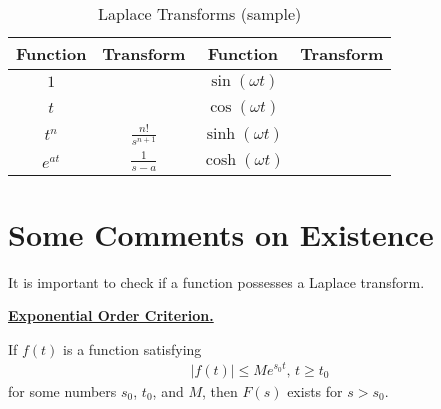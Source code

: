 \documentclass[12pt,a4paper]{article}
\newcommand{\hideNotes}[1]{%
	\phantom{#1}
	}
\newcommand{\hideNotes}[1]{#1}
\begin{document}
\begin{table}[ht!]
\centering
{\renewcommand{\arraystretch}{2.49}
	\setlength{\tabcolsep}{2pt}
\begin{tabular}{|c|c||c|c|}
\hline
\hspace{0.75cm} \textbf{Function} \hspace{0.75cm} & \hspace{0.75cm} \textbf{Transform} \hspace{0.75cm} & \hspace{0.75cm} \textbf{Function} \hspace{0.75cm}  & \hspace{0.75cm} \textbf{Transform} \hspace{0.75cm} \\\hline
\hfill $1$ \hfill\hfill & $\hideNotes{\displaystyle\frac{1}{s}}$ &  \hfill $\sin (\omega t )$ \hfill \hfill & $\hideNotes{\displaystyle\frac{\omega}{s^2 + \omega^2}}$ \\\hline
 \hfill $t$ \hfill\hfill & $\hideNotes{\displaystyle\frac{1}{s^2}}$ &  \hfill $\cos (\omega t )$ \hfill \hfill & $\hideNotes{\displaystyle \frac{s}{s^2 + \omega^2}}$ \\\hline
 \hfill $t^n $ \hfill \hfill & $\displaystyle\frac{n!}{s^{n + 1}}$ &  \hfill $\sinh (\omega t)$ \hfill \hfill  & $\hideNotes{\displaystyle\frac{\omega}{s^2 - \omega^2}}$ \\\hline
 \hfill $e^{at}$ \hfill \hfill & $\displaystyle \frac{1}{s - a}$ &  \hfill $\cosh (\omega t)$ \hfill \hfill & $\hideNotes{\displaystyle\frac{s}{s^2 - \omega^2}}$ \\\hline
\end{tabular}}
\caption{Laplace Transforms (sample)}
\end{table}

\newpage

\section{Some Comments on Existence}
	It is important to check if a function possesses a Laplace transform.
	
	\vspace*{16pt}
	
	\underline{\textbf{Exponential Order Criterion.}}
	
	If $f(t)$ is a function satisfying
		\begin{align*}
		|f(t)| \leq M e^{s_0 t} , \, t \geq t_0
		\end{align*}
	for some numbers $s_0$, $t_0$, and $M$, then $F(s)$ exists for $s > s_0$.
	
\end{document}
